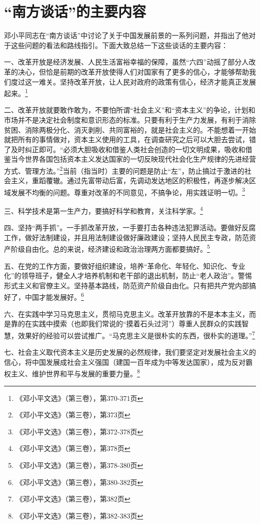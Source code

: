 \documentclass[12pt]{article}
\begin{document}
\section{“南方谈话”的主要内容}
邓小平同志在“南方谈话”中讨论了关于中国发展前景的一系列问题，并指出了他对于这些问题的看法和路线指引。下面大致总结一下这些谈话的主要内容：

一、改革开放是经济发展、人民生活富裕幸福的保障，虽然“六四”动摇了部分人改革的决心，但恰是前期的改革开放使得人们对国家有了更多的信心，才能够帮助我们度过这一难关。坚持改革开放，让人民对政府的政策有信心，经济才能真正发展起来。\footnote{《邓小平文选》（第三卷），第370-371页}

二、改革开放就要敢作敢为，不要怕所谓“社会主义”和“资本主义”的争论，计划和市场并不是决定社会制度和意识形态的标准。只要有利于生产力发展，有利于消除贫困、消除两极分化、消灭剥削、共同富裕的，就是社会主义的。不能想着一开始就把所有的事情做对，资本主义使用的工具，在调查研究之后可以大胆去尝试，错了及时纠正即可。“必须大胆吸收和借鉴人类社会创造的一切文明成果，吸收和借鉴当今世界各国包括资本主义发达国家的一切反映现代社会化生产规律的先进经营方式、管理方法。”\footnote{《邓小平文选》（第三卷），第373页}当前（指当时）主要的问题是防止“左”，防止搞过于激进的社会主义，重蹈覆辙。通过先富带动后富，先调动发达地区的积极性，再逐步解决区域发展不均衡的问题。尊重对改革的不同意见，不搞争论，用实践证明一切。\footnote{《邓小平文选》（第三卷），第372-378页}

三、科学技术是第一生产力，要搞好科学和教育，关注科学家。\footnote{《邓小平文选》（第三卷），第378页}

四、坚持“两手抓”。一手抓改革开放，一手要打击各种违法犯罪活动。要做好反腐工作，做好法制建设，并且用法制建设做好廉政建设；坚持人民民主专政，防范资产阶级自由化。总的来说，经济建设和政治治理两方面都要搞好。\footnote{《邓小平文选》（第三卷），第378-380页}

五、在党的工作方面，要做好组织建设，培养“革命化、年轻化、知识化、专业化”的领导班子，健全人才培养机制和老干部的退出机制，防止“老人政治”。警惕形式主义和官僚主义。坚持基本路线，防范资产阶级自由化。只有把共产党内部搞好了，中国才能发展好。\footnote{《邓小平文选》（第三卷），第380-382页}

六、在实践中学习马克思主义，贯彻马克思主义。改革开放靠的不是本本主义，而是靠的在实践中摸索（也即我们常说的“摸着石头过河”）尊重人民群众的实践智慧，效果好的经验可以尝试推广。“马克思主义是很朴实的东西，很朴实的道理。”\footnote{《邓小平文选》（第三卷），第382页}

七、社会主义取代资本主义是历史发展的必然规律，我们要坚定对发展社会主义的信心，将中国发展成社会主义强国（建国一百年成为中等发达国家），成为反对霸权主义、维护世界和平与发展的重要力量。\footnote{《邓小平文选》（第三卷），第382-383页}
\end{document}

